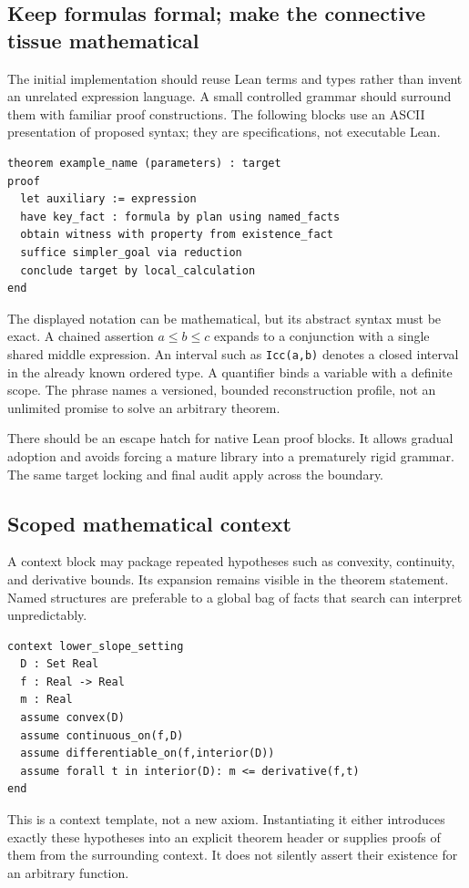 \documentclass[11pt,a4paper]{article}
\newcommand{\code}[1]{\nolinkurl{#1}}
\theoremstyle{definition}
\theoremstyle{remark}
\numberwithin{equation}{section}
\begin{document}
\subsection{Keep formulas formal; make the connective tissue mathematical}
The initial implementation should reuse Lean terms and types rather than invent an unrelated expression language. A small controlled grammar should surround them with familiar proof constructions. The following blocks use an ASCII presentation of proposed syntax; they are specifications, not executable Lean.
\begin{lstlisting}
theorem example_name (parameters) : target
proof
  let auxiliary := expression
  have key_fact : formula by plan using named_facts
  obtain witness with property from existence_fact
  suffice simpler_goal via reduction
  conclude target by local_calculation
end
\end{lstlisting}
The displayed notation can be mathematical, but its abstract syntax must be exact. A chained assertion $a\le b\le c$ expands to a conjunction with a single shared middle expression. An interval such as \code{Icc(a,b)} denotes a closed interval in the already known ordered type. A quantifier binds a variable with a definite scope. The phrase \texttt{} names a versioned, bounded reconstruction profile, not an unlimited promise to solve an arbitrary theorem.

There should be an escape hatch for native Lean proof blocks. It allows gradual adoption and avoids forcing a mature library into a prematurely rigid grammar. The same target locking and final audit apply across the boundary.

\subsection{Scoped mathematical context}
A context block may package repeated hypotheses such as convexity, continuity, and derivative bounds. Its expansion remains visible in the theorem statement. Named structures are preferable to a global bag of facts that search can interpret unpredictably.
\begin{lstlisting}
context lower_slope_setting
  D : Set Real
  f : Real -> Real
  m : Real
  assume convex(D)
  assume continuous_on(f,D)
  assume differentiable_on(f,interior(D))
  assume forall t in interior(D): m <= derivative(f,t)
end
\end{lstlisting}
This is a context template, not a new axiom. Instantiating it either introduces exactly these hypotheses into an explicit theorem header or supplies proofs of them from the surrounding context. It does not silently assert their existence for an arbitrary function.
\end{document}
